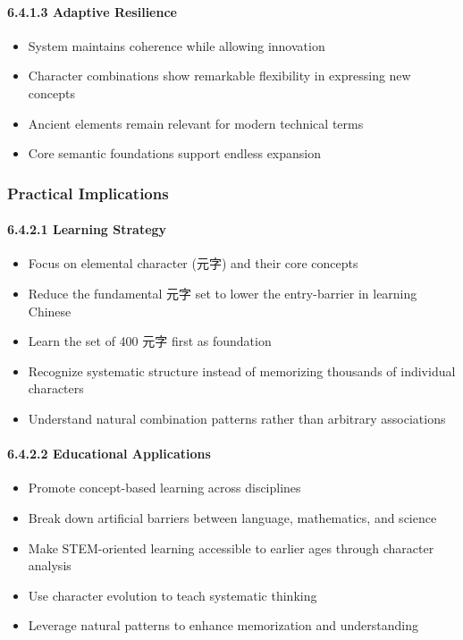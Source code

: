 \documentclass[11pt,letterpaper]{article}
\begin{document}
\paragraph{6.4.1.3 Adaptive Resilience}\label{adaptive-resilience}

\begin{itemize}
\tightlist
\item
  System maintains coherence while allowing innovation
\item
  Character combinations show remarkable flexibility in expressing new
  concepts
\item
  Ancient elements remain relevant for modern technical terms
\item
  Core semantic foundations support endless expansion
\end{itemize}

\subsubsection{Practical Implications}\label{practical-implications}

\paragraph{6.4.2.1 Learning Strategy}\label{learning-strategy}

\begin{itemize}
\tightlist
\item
  Focus on elemental character (元字) and their core concepts
\item
  Reduce the fundamental 元字 set to lower the entry-barrier in learning
  Chinese
\item
  Learn the set of 400 元字 first as foundation
\item
  Recognize systematic structure instead of memorizing thousands of
  individual characters
\item
  Understand natural combination patterns rather than arbitrary
  associations
\end{itemize}

\paragraph{6.4.2.2 Educational
Applications}\label{educational-applications}

\begin{itemize}
\tightlist
\item
  Promote concept-based learning across disciplines
\item
  Break down artificial barriers between language, mathematics, and
  science
\item
  Make STEM-oriented learning accessible to earlier ages through
  character analysis
\item
  Use character evolution to teach systematic thinking
\item
  Leverage natural patterns to enhance memorization and understanding
\end{itemize}
\end{document}
